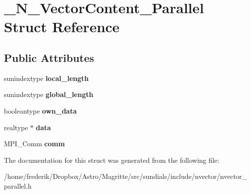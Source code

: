 \hypertarget{struct__N__VectorContent__Parallel}{}\section{\+\_\+\+N\+\_\+\+Vector\+Content\+\_\+\+Parallel Struct Reference}
\label{struct__N__VectorContent__Parallel}
\subsection*{Public Attributes}
\begin{DoxyCompactItemize}
\item 
\mbox{\label{struct__N__VectorContent__Parallel_a2ccd8be85b9cc8f3de94d365feb35bfb}} 
sunindextype {\bfseries local\+\_\+length}
\item 
\mbox{\label{struct__N__VectorContent__Parallel_a62f640f60d5f1f4c3220c8d50745c9f5}} 
sunindextype {\bfseries global\+\_\+length}
\item 
\mbox{\label{struct__N__VectorContent__Parallel_a5b710a080a7449abf074d9a1f5b7d2f5}} 
booleantype {\bfseries own\+\_\+data}
\item 
\mbox{\label{struct__N__VectorContent__Parallel_a581353811162cf119319e8f1a9ef2b69}} 
realtype $\ast$ {\bfseries data}
\item 
\mbox{\label{struct__N__VectorContent__Parallel_a2e33635f7023ca47fc3da28f0b444db5}} 
M\+P\+I\+\_\+\+Comm {\bfseries comm}
\end{DoxyCompactItemize}


The documentation for this struct was generated from the following file\+:\begin{DoxyCompactItemize}
\item 
/home/frederik/\+Dropbox/\+Astro/\+Magritte/src/sundials/include/nvector/nvector\+\_\+parallel.\+h\end{DoxyCompactItemize}
